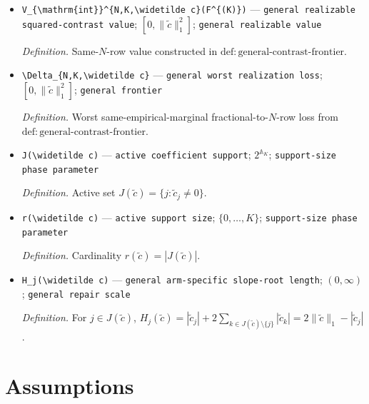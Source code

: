 \documentclass{article}
\begin{document}
\begin{itemize}
  \par\smallskip\noindent\emph{Definition.} Fractional value constructed in \(\mathrm{def{:}general\mbox{-}contrast\mbox{-}frontier}\).
  \item \texttt{V\_\allowbreak{}\{\textbackslash{}\allowbreak{}mathrm\{int\}\allowbreak{}\}\allowbreak{}\textasciicircum{}\{N,\allowbreak{}K,\allowbreak{}\textbackslash{}\allowbreak{}widetilde c\}\allowbreak{}(F\textasciicircum{}\{(K)\}\allowbreak{})} --- \texttt{general realizable squared-\allowbreak{}contrast value}; \([0,\|\widetilde c\|_1^2]\); \texttt{general realizable value}
  \par\smallskip\noindent\emph{Definition.} Same-\(N\)-row value constructed in \(\mathrm{def{:}general\mbox{-}contrast\mbox{-}frontier}\).
  \item \texttt{\textbackslash{}\allowbreak{}Delta\_\allowbreak{}\{N,\allowbreak{}K,\allowbreak{}\textbackslash{}\allowbreak{}widetilde c\}\allowbreak{}} --- \texttt{general worst realization loss}; \([0,\|\widetilde c\|_1^2]\); \texttt{general frontier}
  \par\smallskip\noindent\emph{Definition.} Worst same-empirical-marginal fractional-to-\(N\)-row loss from \(\mathrm{def{:}general\mbox{-}contrast\mbox{-}frontier}\).
  \item \texttt{J(\textbackslash{}\allowbreak{}widetilde c)} --- \texttt{active coefficient support}; \(2^{\mathbb A_K}\); \texttt{support-\allowbreak{}size phase parameter}
  \par\smallskip\noindent\emph{Definition.} Active set \(J(\widetilde c)=\{j:\widetilde c_j\ne0\}\).
  \item \texttt{r(\textbackslash{}\allowbreak{}widetilde c)} --- \texttt{active support size}; \(\{0,\ldots,K\}\); \texttt{support-\allowbreak{}size phase parameter}
  \par\smallskip\noindent\emph{Definition.} Cardinality \(r(\widetilde c)=|J(\widetilde c)|\).
  \item \texttt{H\_\allowbreak{}j(\textbackslash{}\allowbreak{}widetilde c)} --- \texttt{general arm-\allowbreak{}specific slope-\allowbreak{}root length}; \((0,\infty)\); \texttt{general repair scale}
  \par\smallskip\noindent\emph{Definition.} For \(j\in J(\widetilde c)\), \(H_j(\widetilde c)=|\widetilde c_j|+2\sum_{k\in J(\widetilde c)\setminus\{j\}}|\widetilde c_k|=2\|\widetilde c\|_1-|\widetilde c_j|\).
\end{itemize}

\section{Assumptions}
\end{document}
